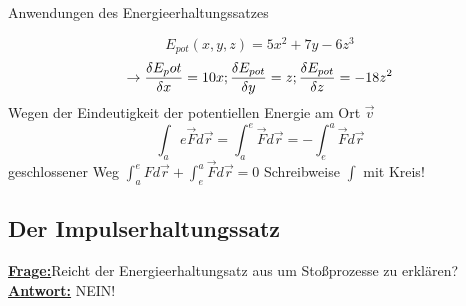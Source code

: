 \documentclass[a4paper,10pt]{scrartcl}
\begin{document}
\begin{seg}{Anwendungen des Energieerhaltungssatzes}
\begin{enumerate}[a)]
\begin{ex*}
\end{ex*}
\begin{ex*}
 \[
  E_{pot}(x,y,z)=5x^2+7y-6z^3
 \]
\[
 \to \frac{\delta E_pot}{\delta x}=10x; \frac{\delta E_{pot}}{\delta y}=z; \frac{\delta E_{pot}}{\delta z}=-18 z^2
\]
Wegen der Eindeutigkeit der potentiellen Energie am Ort $\vec v$ 
\[
 \int_{a}{e} \vec F d\vec r=\int_a^e \vec F d\vec r=-\int_e^a \vec F d\vec r
\]
geschlossener Weg $\int_a^e Fd\vec{r}+\int_e^a \vec F d\vec{r}=0$ Schreibweise $\int$ mit Kreis!
\end{ex*}
  \end{enumerate}
 \end{seg}      
\subsection{Der Impulserhaltungssatz}
\underline{\textbf{Frage:}}Reicht der Energieerhaltungsatz aus um Stoßprozesse zu erklären?\\
\underline{\textbf{Antwort:}} NEIN!\\
\end{document}
